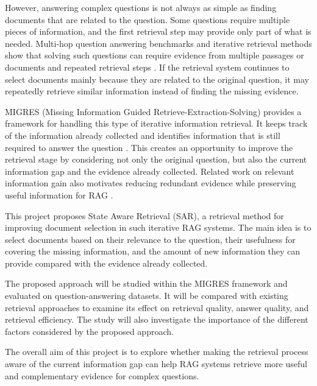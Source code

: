 \documentclass[12pt,a4paper]{report}
\begin{document}
However, answering complex questions is not always as simple as finding documents that are related to the question. Some questions require multiple pieces of information, and the first retrieval step may provide only part of what is needed. Multi-hop question answering benchmarks and iterative retrieval methods show that solving such questions can require evidence from multiple passages or documents and repeated retrieval steps \cite{yang2018hotpotqa,trivedi2022musique,yadav2020iterative}. If the retrieval system continues to select documents mainly because they are related to the original question, it may repeatedly retrieve similar information instead of finding the missing evidence.

MIGRES (Missing Information Guided Retrieve-Extraction-Solving) provides a framework for handling this type of iterative information retrieval. It keeps track of the information already collected and identifies information that is still required to answer the question \cite{wang2025migres}. This creates an opportunity to improve the retrieval stage by considering not only the original question, but also the current information gap and the evidence already collected. Related work on relevant information gain also motivates reducing redundant evidence while preserving useful information for RAG \cite{pickett2024better}.

This project proposes State Aware Retrieval (SAR), a retrieval method for improving document selection in such iterative RAG systems. The main idea is to select documents based on their relevance to the question, their usefulness for covering the missing information, and the amount of new information they can provide compared with the evidence already collected.

The proposed approach will be studied within the MIGRES framework and evaluated on question-answering datasets. It will be compared with existing retrieval approaches to examine its effect on retrieval quality, answer quality, and retrieval efficiency. The study will also investigate the importance of the different factors considered by the proposed approach.

The overall aim of this project is to explore whether making the retrieval process aware of the current information gap can help RAG systems retrieve more useful and complementary evidence for complex questions.

\clearpage

\end{document}
